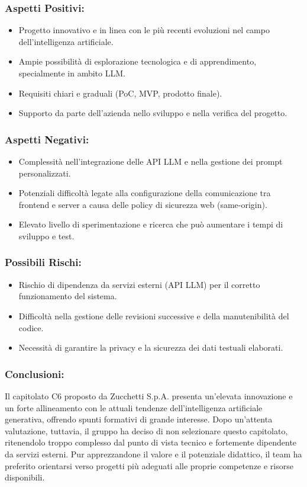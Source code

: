 \documentclass[a4paper,12pt]{article}
\begin{document}
\subsubsection*{Aspetti Positivi:}
\begin{itemize}
    \item Progetto innovativo e in linea con le più recenti evoluzioni nel campo
          dell'intelligenza artificiale.
    \item Ampie possibilità di esplorazione tecnologica e di apprendimento, specialmente
          in ambito LLM.
    \item Requisiti chiari e graduali (PoC, MVP, prodotto finale).
    \item Supporto da parte dell'azienda nello sviluppo e nella verifica del progetto.
\end{itemize}

\subsubsection*{Aspetti Negativi:}
\begin{itemize}
    \item Complessità nell'integrazione delle API LLM e nella gestione dei prompt
          personalizzati.
    \item Potenziali difficoltà legate alla configurazione della comunicazione tra
          frontend e server a causa delle policy di sicurezza web (same-origin).
    \item Elevato livello di sperimentazione e ricerca che può aumentare i tempi di
          sviluppo e test.
\end{itemize}

\subsubsection*{Possibili Rischi:}
\begin{itemize}
    \item Rischio di dipendenza da servizi esterni (API LLM) per il corretto
          funzionamento del sistema.
    \item Difficoltà nella gestione delle revisioni successive e della manutenibilità del
          codice.
    \item Necessità di garantire la privacy e la sicurezza dei dati testuali elaborati.
\end{itemize}

\subsubsection*{Conclusioni:}
Il capitolato C6 proposto da Zucchetti S.p.A. presenta un'elevata innovazione e un forte allineamento con le attuali tendenze dell'intelligenza artificiale generativa, offrendo spunti formativi di grande interesse.
Dopo un'attenta valutazione, tuttavia, il gruppo ha deciso di non selezionare questo capitolato, ritenendolo troppo complesso dal punto di vista tecnico e fortemente dipendente da servizi esterni.
Pur apprezzandone il valore e il potenziale didattico, il team ha preferito orientarsi verso progetti più adeguati alle proprie competenze e risorse disponibili.
\vspace{2.0cm}
\end{document}
